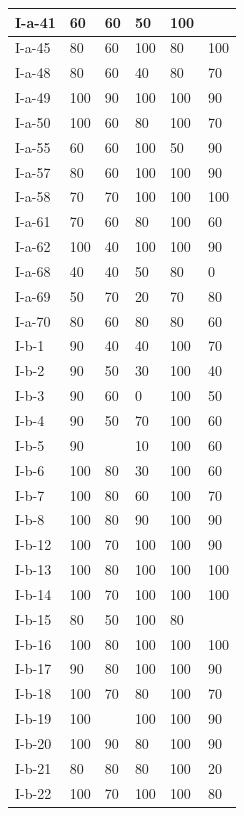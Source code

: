 \documentclass[11pt,a4paper]{article}
\begin{document}
\begin{table}[h]
\begin{tabular}{|l|l|l|l|l|l|}
I-a-41 & 60 & 60 & 50 & 100 &  \\ \hline
I-a-45 & 80 & 60 & 100 & 80 & 100 \\ \hline
I-a-48 & 80 & 60 & 40 & 80 & 70 \\ \hline
I-a-49 & 100 & 90 & 100 & 100 & 90 \\ \hline
I-a-50 & 100 & 60 & 80 & 100 & 70 \\ \hline
I-a-55 & 60 & 60 & 100 & 50 & 90 \\ \hline
I-a-57 & 80 & 60 & 100 & 100 & 90 \\ \hline
I-a-58 & 70 & 70 & 100 & 100 & 100 \\ \hline
I-a-61 & 70 & 60 & 80 & 100 & 60 \\ \hline
I-a-62 & 100 & 40 & 100 & 100 & 90 \\ \hline
I-a-68 & 40 & 40 & 50 & 80 & 0 \\ \hline
I-a-69 & 50 & 70 & 20 & 70 & 80 \\ \hline
I-a-70 & 80 & 60 & 80 & 80 & 60 \\ \hline
I-b-1 & 90 & 40 & 40 & 100 & 70 \\ \hline
I-b-2 & 90 & 50 & 30 & 100 & 40 \\ \hline
I-b-3 & 90 & 60 & 0 & 100 & 50 \\ \hline
I-b-4 & 90 & 50 & 70 & 100 & 60 \\ \hline
I-b-5 & 90 &  & 10 & 100 & 60 \\ \hline
I-b-6 & 100 & 80 & 30 & 100 & 60 \\ \hline
I-b-7 & 100 & 80 & 60 & 100 & 70 \\ \hline
I-b-8 & 100 & 80 & 90 & 100 & 90 \\ \hline
I-b-12 & 100 & 70 & 100 & 100 & 90 \\ \hline
I-b-13 & 100 & 80 & 100 & 100 & 100 \\ \hline
I-b-14 & 100 & 70 & 100 & 100 & 100 \\ \hline
I-b-15 & 80 & 50 & 100 & 80 &  \\ \hline
I-b-16 & 100 & 80 & 100 & 100 & 100 \\ \hline
I-b-17 & 90 & 80 & 100 & 100 & 90 \\ \hline
I-b-18 & 100 & 70 & 80 & 100 & 70 \\ \hline
I-b-19 & 100 &  & 100 & 100 & 90 \\ \hline
I-b-20 & 100 & 90 & 80 & 100 & 90 \\ \hline
I-b-21 & 80 & 80 & 80 & 100 & 20 \\ \hline
I-b-22 & 100 & 70 & 100 & 100 & 80 \\ \hline

\end{tabular}
\end{table}
\end{document}
